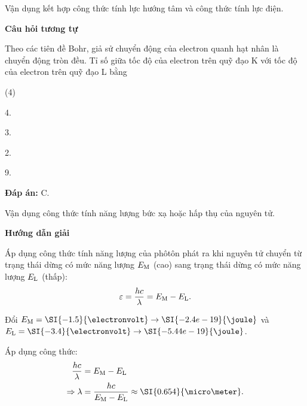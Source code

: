 \begin{dang}{Vận dụng kết hợp công thức tính lực hướng tâm và công thức tính lực điện.}
{		\begin{center}
			\textbf{Câu hỏi tương tự}
		\end{center}
		
		Theo các tiên đề Bohr, giả sử chuyển động của electron quanh hạt nhân là chuyển động tròn đều. Tỉ số giữa tốc độ của electron trên quỹ đạo K với tốc độ của electron trên quỹ đạo L bằng
		\begin{mcq}(4)
			\item 4.
			\item 3.
			\item 2.
			\item 9.
		\end{mcq}
		
		\textbf{Đáp án:} C.}
\end{dang}
\begin{dang}{Vận dụng công thức tính năng lượng bức xạ hoặc hấp thụ của nguyên tử.}
	{\begin{center}
			\textbf{Hướng dẫn giải}
		\end{center}
		
		Áp dụng công thức tính năng lượng của phôtôn phát ra khi nguyên tử chuyển từ trạng thái dừng có mức năng lượng $E_\text M$ (cao) sang trạng thái dừng có mức năng lượng $E_\text L$ (thấp): \begin{equation*}
			\varepsilon = \dfrac {hc}{\lambda} = E_\text M - E_ \text L. 
		\end{equation*}
		
		Đổi $E_\text M = \SI{-1.5}{\electronvolt} \rightarrow \SI{-2.4e-19}{\joule}$ và $E_\text L = \SI{-3.4}{\electronvolt} \rightarrow \SI{-5.44e-19}{\joule}$.
		
		Áp dụng công thức:
		\begin{align*}
			\dfrac{hc}{\lambda}&=E_\text M - E_ \text L \\
			\Rightarrow \lambda &= \dfrac {hc}{E_\text M - E_ \text L} \approx \SI{0.654}{\micro \meter}.
		\end{align*}
		
}
\end{dang}
